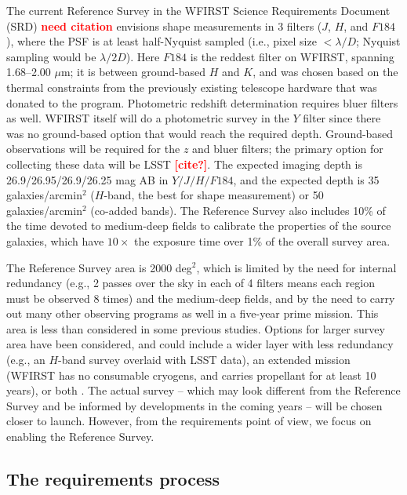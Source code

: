 \documentclass[aps,prd, amsmath,amssymb,superscriptaddress,showkeys,nofootinbib,reprint,preprintnumbers]{revtex4-1}
\newcommand{\verify}[1]{\textcolor{red}{\textbf{{#1}}}}
\begin{document}
The current Reference Survey in the WFIRST Science Requirements Document (SRD) \verify{need citation} envisions shape measurements in 3 filters ($J$, $H$, and $F184$), where the PSF is at least half-Nyquist sampled (i.e., pixel size $<\lambda/D$; Nyquist sampling would be $\lambda/2D$). Here $F184$ is the reddest filter on WFIRST, spanning 1.68--2.00 $\mu$m; it is between ground-based $H$ and $K$, and was chosen based on the thermal constraints from the previously existing telescope hardware that was donated to the program. Photometric redshift determination requires bluer filters as well. WFIRST itself will do a photometric survey in the $Y$ filter since there was no ground-based option that would reach the required depth. Ground-based observations will be required for the $z$ and bluer filters; the primary option for collecting these data will be LSST \verify{[cite?]}. The expected imaging depth is 26.9/26.95/26.9/26.25 mag AB in $Y/J/H/F184$, and the expected depth is 35 galaxies/arcmin$^2$ ($H$-band, the best for shape measurement) or 50 galaxies/arcmin$^2$ (co-added bands). The Reference Survey also includes 10\% of the time devoted to medium-deep fields to calibrate the properties of the source galaxies, which have $10\times$ the exposure time over 1\% of the overall survey area.

The Reference Survey area is 2000 deg$^2$, which is limited by the need for internal redundancy (e.g., 2 passes over the sky in each of 4 filters means each region must be observed 8 times) and the medium-deep fields, and by the need to carry out many other observing programs as well in a five-year prime mission. This area is less than considered in some previous studies. Options for larger survey area have been considered, and could include a wider layer with less redundancy (e.g., an $H$-band survey overlaid with LSST data), an extended mission (WFIRST has no consumable cryogens, and carries propellant for at least 10 years), or both \cite{2019BAAS...51c.418E}. The actual survey -- which may look different from the Reference Survey and be informed by developments in the coming years -- will be chosen closer to launch. However, from the requirements point of view, we focus on enabling the Reference Survey.

\subsection{The requirements process}
\label{ss:req}
\end{document}
